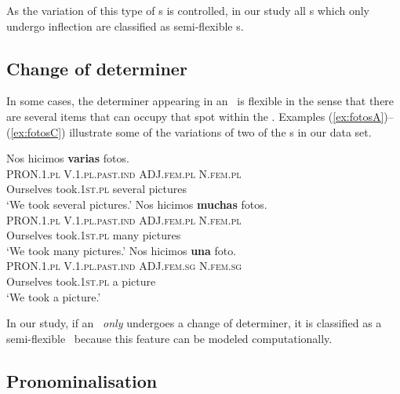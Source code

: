 \documentclass[output=paper]{langsci/langscibook}
\begin{document}
As the variation of this type of \mwe s is controlled, in our study all \mwe s which only undergo inflection are classified as semi-flexible \mwe s.

\largerpage
\subsection{Change of determiner}
\label{ssec:changeDet}

In some cases, the determiner appearing in an \mwe\ is flexible in the sense that there are several items that can occupy that spot within the \mwe.
Examples (\ref{ex:fotosA})--(\ref{ex:fotosC}) illustrate some of the variations of two of the \mwe s in our data set.

\begin{exe}
\ex 
	\begin{xlist}
	\ex \label{ex:fotosA}
    \glll Nos hicimos \textbf{varias} fotos. \\
   \textsc{PRON.1.pl} \textsc{V.1.pl.past.ind} \textsc{ADJ.fem.pl} \textsc{N.fem.pl} \\
    Ourselves {took.\textsc{1st.pl}} several pictures\\
    \glt `We took several pictures.'
	\ex \label{ex:fotosB}
    \glll Nos hicimos \textbf{muchas} fotos. \\
    \textsc{PRON.1.pl} \textsc{V.1.pl.past.ind} \textsc{ADJ.fem.pl} \textsc{N.fem.pl} \\
    Ourselves {took.\textsc{1st.pl}} many pictures\\
    \glt `We took many pictures.'
	\ex \label{ex:fotosC}
    \glll Nos hicimos \textbf{una} foto. \\
    \textsc{PRON.1.pl} \textsc{V.1.pl.past.ind} \textsc{ADJ.fem.sg} \textsc{N.fem.sg} \\
    Ourselves {took.\textsc{1st.pl}} a picture\\
    \glt `We took a picture.'
	\end{xlist}
\end{exe}

In our study, if an \mwe\ \textit{only} undergoes a change of determiner, it is classified as a semi-flexible \mwe\ because this feature can be modeled computationally.

 
\subsection{Pronominalisation}
\label{ssec:pronominalisation}
\end{document}
